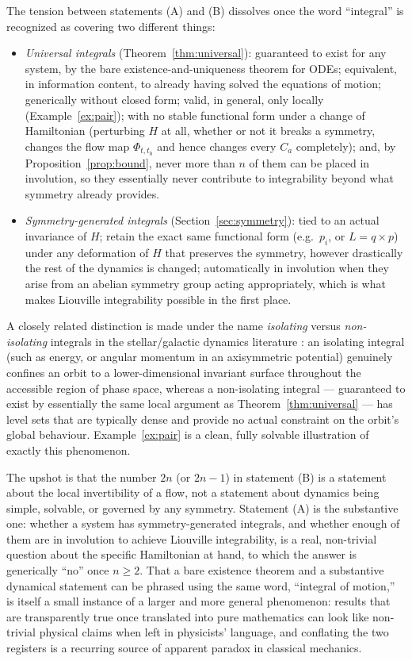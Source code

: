 \documentclass[11pt]{article}
\theoremstyle{definition}
\theoremstyle{remark}
\begin{document}
The tension between statements (A) and (B) dissolves once the word
``integral'' is recognized as covering two different things:
\begin{itemize}
\item \emph{Universal integrals} (Theorem~\ref{thm:universal}): guaranteed
to exist for any system, by the bare existence-and-uniqueness theorem for
ODEs; equivalent, in information content, to already having solved the
equations of motion; generically without closed form; valid, in general,
only locally (Example~\ref{ex:pair}); with no stable functional form under
a change of Hamiltonian (perturbing $H$ at all, whether or not it breaks a
symmetry, changes the flow map $\Phi_{t,t_0}$ and hence changes every
$C_a$ completely); and, by Proposition~\ref{prop:bound}, never more than
$n$ of them can be placed in involution, so they essentially never
contribute to integrability beyond what symmetry already provides.
\item \emph{Symmetry-generated integrals} (Section~\ref{sec:symmetry}):
tied to an actual invariance of $H$; retain the exact same functional form
(e.g.\ $p_i$, or $L=q\times p$) under any deformation of $H$ that preserves
the symmetry, however drastically the rest of the dynamics is changed;
automatically in involution when they arise from an abelian symmetry group
acting appropriately, which is what makes Liouville integrability possible
in the first place.
\end{itemize}
A closely related distinction is made under the name \emph{isolating}
versus \emph{non-isolating} integrals in the stellar/galactic dynamics
literature \cite{binneytremaine}: an isolating integral (such as energy, or
angular momentum in an axisymmetric potential) genuinely confines an orbit
to a lower-dimensional invariant surface throughout the accessible region
of phase space, whereas a non-isolating integral --- guaranteed to exist by
essentially the same local argument as Theorem~\ref{thm:universal} --- has
level sets that are typically dense and provide no actual constraint on the
orbit's global behaviour. Example~\ref{ex:pair} is a clean, fully solvable
illustration of exactly this phenomenon.

The upshot is that the number $2n$ (or $2n-1$) in statement (B) is a
statement about the local invertibility of a flow, not a statement about
dynamics being simple, solvable, or governed by any symmetry. Statement (A)
is the substantive one: whether a system has symmetry-generated integrals,
and whether enough of them are in involution to achieve Liouville
integrability, is a real, non-trivial question about the specific
Hamiltonian at hand, to which the answer is generically ``no'' once
$n\ge 2$. That a bare existence theorem and a substantive dynamical
statement can be phrased using the same word, ``integral of motion,'' is
itself a small instance of a larger and more general phenomenon: results
that are transparently true once translated into pure mathematics can look
like non-trivial physical claims when left in physicists' language, and
conflating the two registers is a recurring source of apparent paradox in
classical mechanics.
\end{document}
